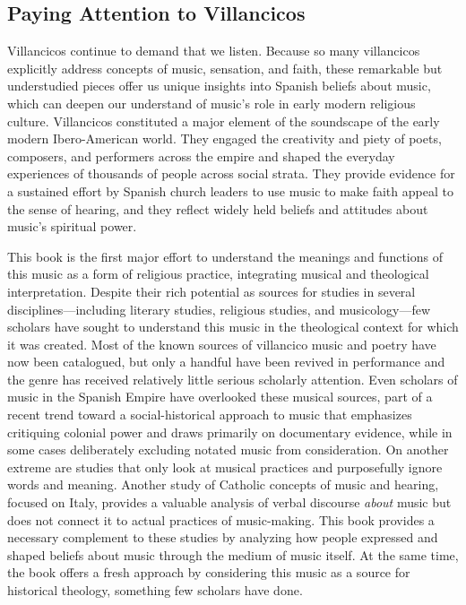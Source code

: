 \subsection{Paying Attention to Villancicos}

Villancicos continue to demand that we listen. 
Because so many villancicos explicitly address concepts of music, sensation,
and faith, these remarkable but understudied pieces offer us unique insights
into Spanish beliefs about music, which can deepen our understand of music's
role in early modern religious culture.
Villancicos constituted a major element of the soundscape of the
early modern Ibero-American world.
They engaged the creativity and piety of poets, composers, and performers
across the empire and shaped the everyday experiences of thousands of people
across social strata.
They provide evidence for a sustained effort by Spanish church leaders to use
music to make faith appeal to the sense of hearing, and they reflect widely
held beliefs and attitudes about music's spiritual power.

This book is the first major effort to understand the meanings and functions of
this music as a form of religious practice, integrating musical and theological
interpretation.
Despite their rich potential as sources for studies in several
disciplines---including literary studies, religious studies, and
musicology---few scholars have sought to understand this music in the
theological context for which it was created.
Most of the known sources of villancico music and poetry have now been
catalogued, but only a handful have been revived in performance and the
genre has received relatively little serious scholarly attention.
Even scholars of music in the Spanish Empire have overlooked these musical
sources, part of a recent trend toward a social-historical approach to music
that emphasizes critiquing colonial power and draws primarily on documentary
evidence, while in some cases deliberately excluding notated music from
consideration.%
On another extreme are studies that only look at musical practices and
purposefully ignore words and meaning.%
Another study of Catholic concepts of music and hearing, focused on Italy,
provides a valuable analysis of verbal discourse \emph{about} music but does
not connect it to actual practices of music-making.
This book provides a necessary complement to these studies by analyzing how
people expressed and shaped beliefs about music through the medium of music
itself.
At the same time, the book offers a fresh approach by considering this music as
a source for historical theology, something few scholars have done.

